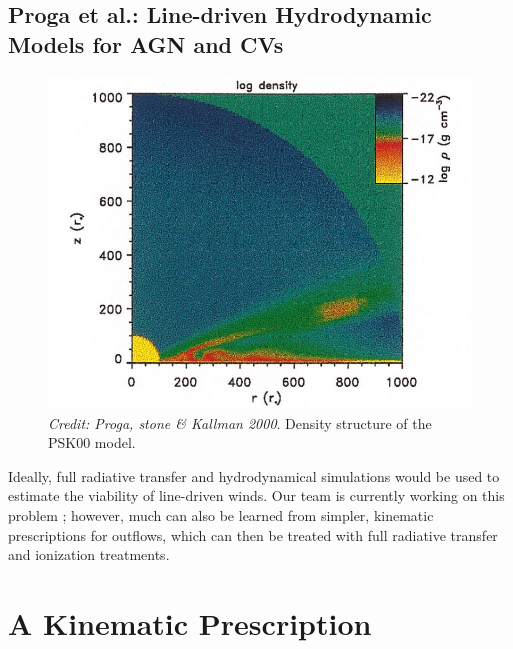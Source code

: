 \subsection{Proga et al.: Line-driven Hydrodynamic Models for AGN and CVs}



\begin{figure}
\centering
\includegraphics[width=1.0\textwidth]{figures/02-outflows/proga2.png}
\caption
{
{\sl Credit: Proga, stone \& Kallman 2000}. 
Density structure of the PSK00 model.
} 
\label{fig:PK04}
\end{figure}

Ideally, full radiative transfer and hydrodynamical simulations would be used
to estimate the viability of line-driven winds. Our team is currently working 
on this problem \citep[see][for a first step]{H14}; however, much 
can also be learned from simpler, kinematic prescriptions for outflows, which
can then be treated with full radiative transfer and ionization treatments.  

\section{A Kinematic Prescription}

